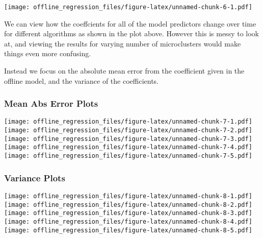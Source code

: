 \documentclass[]{article}
\begin{document}
\texttt{[image: offline\_regression\_files/figure-latex/unnamed-chunk-6-1.pdf]}

We can view how the coeffcients for all of the model predictors change
over time for different algorithms as shown in the plot above. However
this is messy to look at, and viewing the results for varying number of
microclusters would make things even more confusing.

Instead we focus on the absolute mean error from the coefficient given
in the offline model, and the variance of the coefficients.

\subsubsection{Mean Abs Error Plots}\label{mean-abs-error-plots}

\texttt{[image: offline\_regression\_files/figure-latex/unnamed-chunk-7-1.pdf]}
\texttt{[image: offline\_regression\_files/figure-latex/unnamed-chunk-7-2.pdf]}
\texttt{[image: offline\_regression\_files/figure-latex/unnamed-chunk-7-3.pdf]}
\texttt{[image: offline\_regression\_files/figure-latex/unnamed-chunk-7-4.pdf]}
\texttt{[image: offline\_regression\_files/figure-latex/unnamed-chunk-7-5.pdf]}

\subsubsection{Variance Plots}\label{variance-plots}

\texttt{[image: offline\_regression\_files/figure-latex/unnamed-chunk-8-1.pdf]}
\texttt{[image: offline\_regression\_files/figure-latex/unnamed-chunk-8-2.pdf]}
\texttt{[image: offline\_regression\_files/figure-latex/unnamed-chunk-8-3.pdf]}
\texttt{[image: offline\_regression\_files/figure-latex/unnamed-chunk-8-4.pdf]}
\texttt{[image: offline\_regression\_files/figure-latex/unnamed-chunk-8-5.pdf]}
\end{document}
